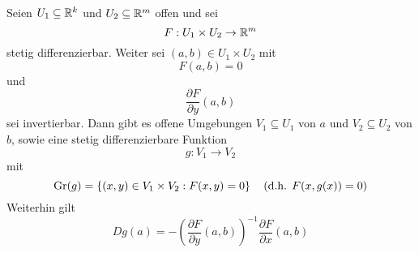 \begin{theorem}
	Seien
	$
		U_1 \subseteq \mathbb{R} ^k
	$
	und
	$
		U_2 \subseteq \mathbb{R} ^m
	$
	offen und sei
	\[
		F : U_1 \times U_2 \to \mathbb{R} ^m
	\]
	stetig differenzierbar.
	Weiter sei
	$
		(a, b) \in U_1 \times U_2
	$
	mit
	\[
		F(a, b) = 0
	\]
	und
	\[
		\frac{ \partial F }{ \partial y } (a, b)
	\]
	sei invertierbar.
	Dann gibt es offene Umgebungen $ V_1 \subseteq U_1 $ von $ a $ und $ V_2 \subseteq U_2 $ von $ b $, sowie eine stetig differenzierbare Funktion
	\[
		g : V_1 \to V_2
	\]
	mit
	\[
		\operatorname{Gr}(g) = \left\{ (x, y) \in V_1 \times V_2 : F(x, y) = 0 \right\} \quad \left( \text{d.h. } F(x, g(x)) = 0 \right) 
	\]
	Weiterhin gilt
	\[
		Dg(a) =
		- \left(
			\frac{ \partial F }{ \partial y } (a, b)
		\right)^{-1} 
		\frac{ \partial F }{ \partial x } (a, b)
	\]
\end{theorem}
